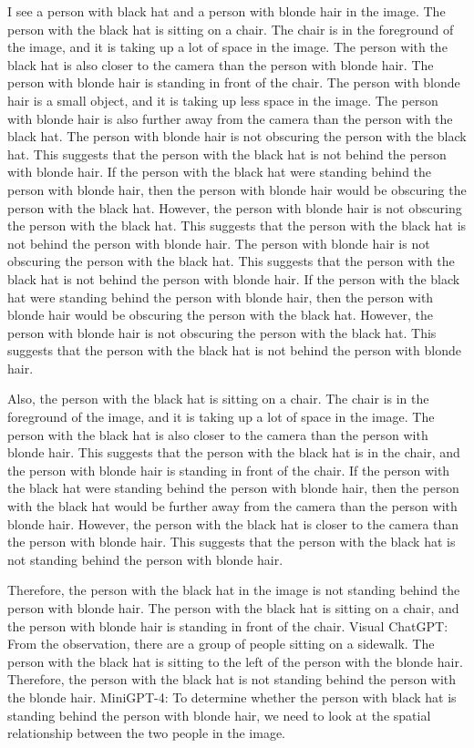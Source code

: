 \begin{enumerate}
    I see a person with black hat and a person with blonde hair in the image.
    The person with the black hat is sitting on a chair. The chair is in the foreground of the image, and it is taking up a lot of space in the image. The person with the black hat is also closer to the camera than the person with blonde hair.
    The person with blonde hair is standing in front of the chair. The person with blonde hair is a small object, and it is taking up less space in the image. The person with blonde hair is also further away from the camera than the person with the black hat.
    The person with blonde hair is not obscuring the person with the black hat. This suggests that the person with the black hat is not behind the person with blonde hair.
    If the person with the black hat were standing behind the person with blonde hair, then the person with blonde hair would be obscuring the person with the black hat. However, the person with blonde hair is not obscuring the person with the black hat. This suggests that the person with the black hat is not behind the person with blonde hair.
    The person with blonde hair is not obscuring the person with the black hat. This suggests that the person with the black hat is not behind the person with blonde hair. If the person with the black hat were standing behind the person with blonde hair, then the person with blonde hair would be obscuring the person with the black hat. However, the person with blonde hair is not obscuring the person with the black hat. This suggests that the person with the black hat is not behind the person with blonde hair.
    
    Also, the person with the black hat is sitting on a chair. The chair is in the foreground of the image, and it is taking up a lot of space in the image. The person with the black hat is also closer to the camera than the person with blonde hair. This suggests that the person with the black hat is in the chair, and the person with blonde hair is standing in front of the chair. If the person with the black hat were standing behind the person with blonde hair, then the person with the black hat would be further away from the camera than the person with blonde hair. However, the person with the black hat is closer to the camera than the person with blonde hair. This suggests that the person with the black hat is not standing behind the person with blonde hair.
    
    Therefore, the person with the black hat in the image is not standing behind the person with blonde hair. The person with the black hat is sitting on a chair, and the person with blonde hair is standing in front of the chair.
    \subitem Visual ChatGPT: From the observation, there are a group of people sitting on a sidewalk. The person with the black hat is sitting to the left of the person with the blonde hair. Therefore, the person with the black hat is not standing behind the person with the blonde hair.
    \subitem MiniGPT-4: To determine whether the person with black hat is standing behind the person with blonde hair, we need to look at the spatial relationship between the two people in the image.


\end{enumerate}
